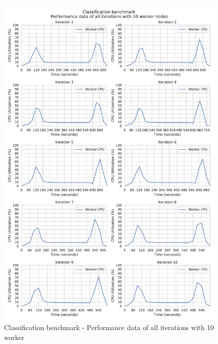 \begin{figure}[h]
\centering
\includegraphics[scale=0.5]{images/appendix/evaluation_data/classification_benchmark/classification_10_worker_cpu_performance}
\caption{Classification benchmark - Performance data of all iterations with 10 worker}
\label{fig:appendix_eval_classification_static10}
\end{figure}

